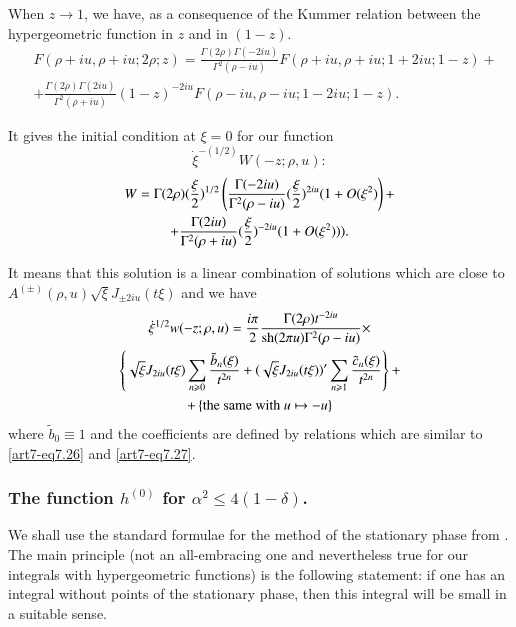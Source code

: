 When $z \to 1$, we have, as a consequence of the Kummer relation between the hypergeometric function in $z$ and in $(1-z)$.
\begin{equation}
\begin{split}
& F(\rho + iu, \rho + iu; 2 \rho ; z) = \frac{\Gamma (2 \rho) \Gamma (-2 iu)}{\Gamma^2 (\rho - iu)} F (\rho + iu, \rho + iu; 1+ 2 iu ; 1-z) +\\
& + \frac{\Gamma (2\rho) \Gamma (2 iu)}{\Gamma^2 (\rho + iu)} (1-z)^{-2iu} F (\rho - iu, \rho - iu; 1-2 iu ; 1-z). 
\end{split}
\label{art7-eq7.33}
\end{equation}\pageoriginale 

It gives the initial condition at $\xi = 0$ for our function 
$$
\dot{\xi}^{-(1/2)} W (-z ; \rho , u):
$$
\begin{gather}
W = \Gamma (2 \rho) (\frac{\xi}{2})^{1/2}  \left(\frac{\Gamma (-2 iu)}{\Gamma^2(\rho - iu)} (\frac{\xi}{2})^{2iu} (1+O(\xi^2) \right) +\label{art7-eq7.34}\\
+ \frac{\Gamma (2 i u)}{\Gamma^2 (\rho + iu)} (\frac{\xi}{2})^{-2 iu} (1+ O (\xi^2))). \notag
\end{gather}

It means that this solution is a linear combination of solutions which are close to $A^{(\pm)} (\rho, u) \sqrt{\xi} J_{\pm 2 iu } (t \xi)$ and we have
\begin{gather}
\dot{\xi}^{1/2} w (-z; \rho,u) = \frac{i\pi}{2} \frac{\Gamma (2 \rho) t^{-2 i u}}{\text{sh} (2 \pi u) \Gamma^2 (\rho - iu)} \times \label{art7-eq7.35}\\
\left\{\sqrt{\xi} J_{2 i u} (t \xi) \sum\limits_{n \geqslant 0} \frac{\tilde{b}_n (\xi)}{t^{2n}} + (\sqrt{\xi} J_{ 2i u} (t \xi))' \sum\limits_{n \geqslant 1} \frac{\tilde{c}_n (\xi)}{t^{2n}}\right\}  + \notag\\
+ \left\{\text{the same with } u \mapsto - u \right\}\notag
\end{gather}
where $\tilde{b}_0 \equiv 1$ and the coefficients are defined by relations which are similar to \eqref{art7-eq7.26} and \eqref{art7-eq7.27}.

\setcounter{section}{2}
\subsubsection{The function $h^{(0)}$ for $\alpha^2 \leqslant 4 (1-\delta)$.}\label{art7-subsubsec2.6.6}
We shall use the standard formulae for the method of the stationary phase from \cite{art7-key6}. The main principle (not an all-embracing one and nevertheless true for our integrals with hypergeometric functions) is the following statement: if one has an integral without points of the stationary phase, then this integral will be small in a suitable sense. 

